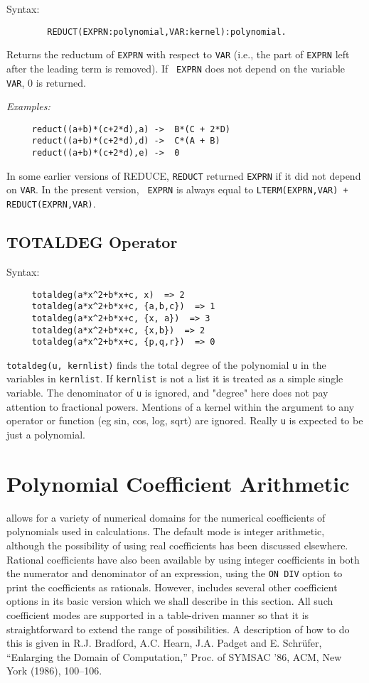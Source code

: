 Syntax:
\begin{verbatim}
        REDUCT(EXPRN:polynomial,VAR:kernel):polynomial.
\end{verbatim}
Returns the reductum of \texttt{EXPRN} with respect to \texttt{VAR} (i.e., the
part of \texttt{EXPRN} left after the leading term is removed).  If {\tt
EXPRN} does not depend on the variable \texttt{VAR}, 0 is returned.

\textit{Examples:}
\begin{verbatim}
     reduct((a+b)*(c+2*d),a) ->  B*(C + 2*D)
     reduct((a+b)*(c+2*d),d) ->  C*(A + B)
     reduct((a+b)*(c+2*d),e) ->  0
\end{verbatim}

{\COMPATNOTE} In some earlier versions of REDUCE, \texttt{REDUCT} returned
\texttt{EXPRN} if it did not depend on \texttt{VAR}.  In the present version, {\tt
EXPRN} is always equal to \texttt{LTERM(EXPRN,VAR) + REDUCT(EXPRN,VAR)}.

\subsection{TOTALDEG Operator}
\hypertarget{operator:TOTALDEG}{}

Syntax:
\begin{verbatim}
     totaldeg(a*x^2+b*x+c, x)  => 2
     totaldeg(a*x^2+b*x+c, {a,b,c})  => 1
     totaldeg(a*x^2+b*x+c, {x, a})  => 3
     totaldeg(a*x^2+b*x+c, {x,b})  => 2
     totaldeg(a*x^2+b*x+c, {p,q,r})  => 0
\end{verbatim}
\texttt{totaldeg(u, kernlist)} finds the total degree of the polynomial \texttt{u} in
the variables in \texttt{kernlist}. If \texttt{kernlist} is not a list it is treated
as a simple single variable.
The denominator of \texttt{u} is ignored, and "degree" here does not pay attention
to fractional powers. Mentions of a kernel within the argument to any
operator or function (eg sin, cos, log, sqrt) are ignored. Really \texttt{u} is
expected to be just a polynomial.

\section{Polynomial Coefficient Arithmetic}
{\REDUCE} allows for a variety of numerical domains for the numerical
coefficients of polynomials used in calculations.  The default mode is
integer arithmetic, although the possibility of using real coefficients
 has been discussed elsewhere.  Rational
coefficients have also been available by using integer coefficients in
both the numerator and denominator of an expression, using the 
\texttt{ON DIV} option to print the coefficients as rationals.
However, {\REDUCE} includes several other coefficient options in its basic
version which we shall describe in this section.  All such coefficient
modes are supported in a table-driven manner so that it is
straightforward to extend the range of possibilities.  A description of
how to do this is given in R.J. Bradford, A.C. Hearn, J.A. Padget and
E. Schr\"ufer, ``Enlarging the {\REDUCE} Domain of Computation,'' Proc. of
SYMSAC '86, ACM, New York (1986), 100--106.


